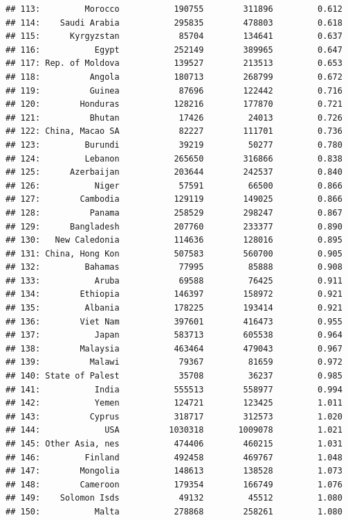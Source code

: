 \documentclass[10pt,]{article}
\begin{document}
\begin{verbatim}
## 113:         Morocco           190755        311896         0.612
## 114:    Saudi Arabia           295835        478803         0.618
## 115:      Kyrgyzstan            85704        134641         0.637
## 116:           Egypt           252149        389965         0.647
## 117: Rep. of Moldova           139527        213513         0.653
## 118:          Angola           180713        268799         0.672
## 119:          Guinea            87696        122442         0.716
## 120:        Honduras           128216        177870         0.721
## 121:          Bhutan            17426         24013         0.726
## 122: China, Macao SA            82227        111701         0.736
## 123:         Burundi            39219         50277         0.780
## 124:         Lebanon           265650        316866         0.838
## 125:      Azerbaijan           203644        242537         0.840
## 126:           Niger            57591         66500         0.866
## 127:        Cambodia           129119        149025         0.866
## 128:          Panama           258529        298247         0.867
## 129:      Bangladesh           207760        233377         0.890
## 130:   New Caledonia           114636        128016         0.895
## 131: China, Hong Kon           507583        560700         0.905
## 132:         Bahamas            77995         85888         0.908
## 133:           Aruba            69588         76425         0.911
## 134:        Ethiopia           146397        158972         0.921
## 135:         Albania           178225        193414         0.921
## 136:        Viet Nam           397601        416473         0.955
## 137:           Japan           583713        605538         0.964
## 138:        Malaysia           463464        479043         0.967
## 139:          Malawi            79367         81659         0.972
## 140: State of Palest            35708         36237         0.985
## 141:           India           555513        558977         0.994
## 142:           Yemen           124721        123425         1.011
## 143:          Cyprus           318717        312573         1.020
## 144:             USA          1030318       1009078         1.021
## 145: Other Asia, nes           474406        460215         1.031
## 146:         Finland           492458        469767         1.048
## 147:        Mongolia           148613        138528         1.073
## 148:        Cameroon           179354        166749         1.076
## 149:    Solomon Isds            49132         45512         1.080
## 150:           Malta           278868        258261         1.080

\end{verbatim}
\end{document}
